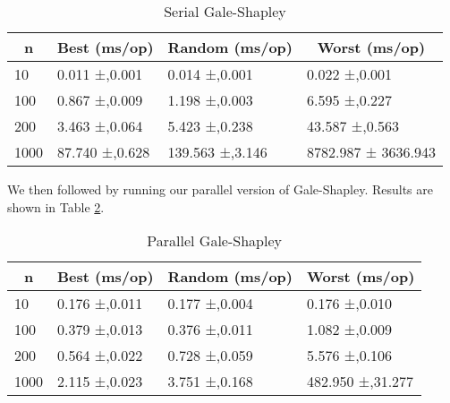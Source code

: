 \begin{table}[h]
    \centering
\begin{tabular}{|l|l|l|l|}
\hline
\multicolumn{1}{|c|}{\textbf{n}} & \multicolumn{1}{c|}{\textbf{Best (ms/op)}} & \multicolumn{1}{c|}{\textbf{Random (ms/op)}} & \multicolumn{1}{c|}{\textbf{Worst (ms/op)}} \\ \hline
10                               & 0.011 ±,0.001                              & 0.014 ±,0.001                                & 0.022 ±,0.001                               \\ \hline
100                              & 0.867 ±,0.009                              & 1.198 ±,0.003                                & 6.595 ±,0.227                               \\ \hline
200                              & 3.463 ±,0.064                              & 5.423 ±,0.238                                & 43.587 ±,0.563                              \\ \hline
1000                             & 87.740 ±,0.628                             & 139.563 ±,3.146                              & 8782.987 ± 3636.943                         \\ \hline
\end{tabular}
    \caption{Serial Gale-Shapley}
    \label{tab:serial-gale-shapley}
\end{table}

We then followed by running our parallel version of Gale-Shapley. Results are shown in Table \ref{tab:parallel-gale-shapley}.


\begin{table}[h]
    \centering
\begin{tabular}{|l|l|l|l|}
\hline
\multicolumn{1}{|c|}{\textbf{n}} & \multicolumn{1}{c|}{\textbf{Best (ms/op)}} & \multicolumn{1}{c|}{\textbf{Random (ms/op)}} & \multicolumn{1}{c|}{\textbf{Worst (ms/op)}} \\ \hline
10                               & 0.176 ±,0.011                              & 0.177 ±,0.004                                & 0.176 ±,0.010                               \\ \hline
100                              & 0.379 ±,0.013                              & 0.376 ±,0.011                                & 1.082 ±,0.009                               \\ \hline
200                              & 0.564 ±,0.022                              & 0.728 ±,0.059                                & 5.576 ±,0.106                               \\ \hline
1000                             & 2.115 ±,0.023                              & 3.751 ±,0.168                                & 482.950 ±,31.277                            \\ \hline
\end{tabular}
    \caption{Parallel Gale-Shapley}
    \label{tab:parallel-gale-shapley}
\end{table}

